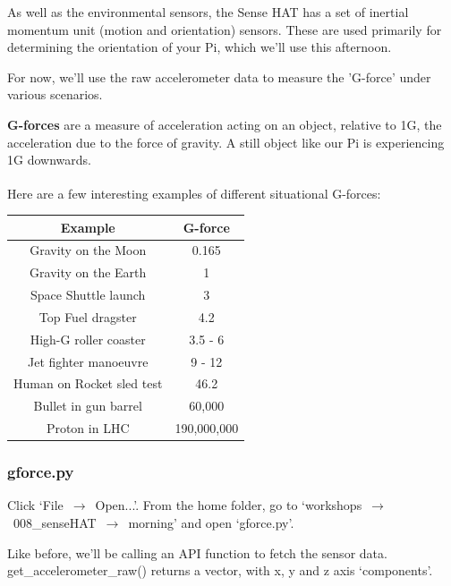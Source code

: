 \documentclass[a4paper, twocolumn, twoside, 12pt]{article}
\newenvironment{aside}
		{
		\begin{mdframed}[
			style=0,%
			leftline=false,
			rightline=false,
			innerbottommargin=2pt,
			innerleftmargin=12pt,
			innerrightmargin=0pt,
			linewidth=0.75pt,
			skipabove=6pt,
			skipbelow=6pt
			]
				\small
				\color{JungleGreen}
				\setlength{\parskip}{2pt}
				\vspace{2pt} %
		}
		{
		\end{mdframed}
		}
\begin{document}
		As well as the environmental sensors, the Sense HAT has a set of inertial momentum unit (motion and orientation) sensors. These are used primarily for determining the orientation of your Pi, which we'll use this afternoon.
		
		For now, we'll use the raw accelerometer data to measure the 'G-force' under various scenarios.
		
		\begin{aside}
			\textbf{G-forces} are a measure of acceleration acting on an object, relative to 1G, the acceleration due to the force of gravity. A still object like our Pi is experiencing 1G downwards.
			
			Here are a few interesting examples of different situational G-forces:\textsuperscript{\cite{gforce}}
			\color{Black}
			\begin{tabular}{|c|c|}
				\hline \textbf{Example} & \textbf{G-force} \\ 
				\hline Gravity on the Moon & 0.165 \\ 
				\hline Gravity on the Earth & 1 \\ 
				\hline Space Shuttle launch & 3 \\ 
				\hline Top Fuel dragster & 4.2 \\ 
				\hline High-G roller coaster & 3.5 - 6 \\ 
				\hline Jet fighter manoeuvre & 9 - 12 \\ 
				\hline Human on Rocket sled test & 46.2 \\ 
				\hline Bullet in gun barrel & 60,000 \\ 
				\hline Proton in LHC & 190,000,000 \\ 
				\hline 
			\end{tabular}
		\end{aside}
		
		\subsubsection*{gforce.py}
		
			Click \mbox{`File $\rightarrow$ Open...'}.
			From the home folder, go to \mbox{`workshops $\rightarrow$ 008\_senseHAT $\rightarrow$ morning'} and open `gforce.py'.
		
			Like before, we'll be calling an API function to fetch the sensor data. get\_accelerometer\_raw() returns a vector, with x, y and z axis `components'.
		
			
		
\end{document}
